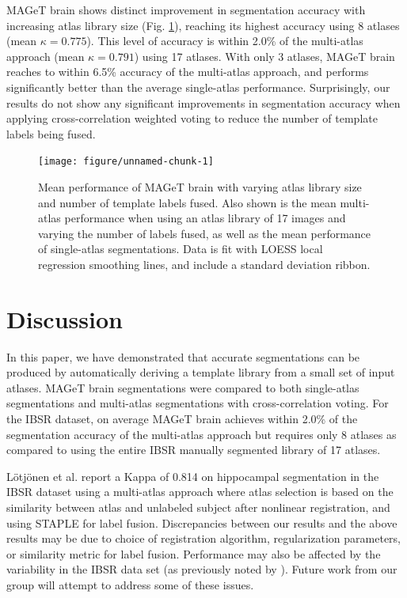 \documentclass{article}\usepackage{graphicx, color}
\newenvironment{knitrout}{}{} %
\begin{document}
MAGeT brain shows distinct improvement in segmentation accuracy with increasing
atlas library size (Fig. \ref{results}), reaching its highest accuracy using 8
atlases (mean $\kappa = 0.775$).  This level of accuracy is within 2.0\% of the
multi-atlas approach (mean $\kappa = 0.791$) using 17 atlases. With only 3
atlases, MAGeT brain reaches to within 6.5\% accuracy of the multi-atlas
approach, and performs significantly better than the average single-atlas
performance. Surprisingly, our results do not show any significant improvements
in segmentation accuracy when applying cross-correlation weighted voting to
reduce the number of template labels being fused.

\begin{figure}
\begin{minipage}[b]{1.0\linewidth}
  \centering
\begin{knitrout}
\color{fgcolor}\texttt{[image: figure/unnamed-chunk-1]} 
\end{knitrout}

\end{minipage}
\caption{
Mean performance of MAGeT brain with varying atlas library size and number of
template labels fused. Also shown is the mean multi-atlas performance when
using an atlas library of 17 images and varying the number of labels fused, as
well as the mean performance of single-atlas segmentations.  Data is fit with
LOESS local regression smoothing lines, and include a standard deviation
ribbon.
}
\label{results}
\end{figure}

\section{Discussion}

In this paper, we have demonstrated that accurate segmentations can be produced
by automatically deriving a template library from a small set of input atlases.
MAGeT brain segmentations were compared to both single-atlas segmentations and
multi-atlas segmentations with cross-correlation voting.  For the IBSR dataset,
on average MAGeT brain achieves within 2.0\% of the segmentation accuracy of
the multi-atlas approach but requires only 8 atlases as compared to using the
entire IBSR manually segmented library of 17 atlases.

L\"{o}tj\"{o}nen et al.\cite{Lotjonen2010} report a Kappa of 0.814 on
hippocampal segmentation in the IBSR dataset using a multi-atlas approach where
atlas selection is based on the similarity between atlas and unlabeled subject
after nonlinear registration, and using STAPLE\cite{Warfield2004} for label
fusion.  Discrepancies between our results and the above results may be due to
choice of registration algorithm, regularization parameters, or similarity
metric for label fusion.  Performance may also be affected by the variability
in the IBSR data set (as previously noted by \cite{Klein2009}).  Future work
from our group will attempt to address some of these issues.
\end{document}
